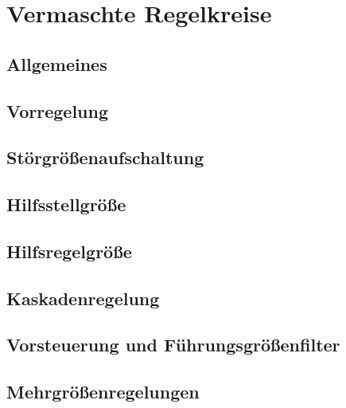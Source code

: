 \section{Vermaschte Regelkreise}


\subsection{Allgemeines}


\subsection{Vorregelung}


\subsection{Störgrößenaufschaltung}


\subsection{Hilfsstellgröße}


\subsection{Hilfsregelgröße}


\subsection{Kaskadenregelung}


\subsection{Vorsteuerung und Führungsgrößenfilter}


\subsection{Mehrgrößenregelungen}

